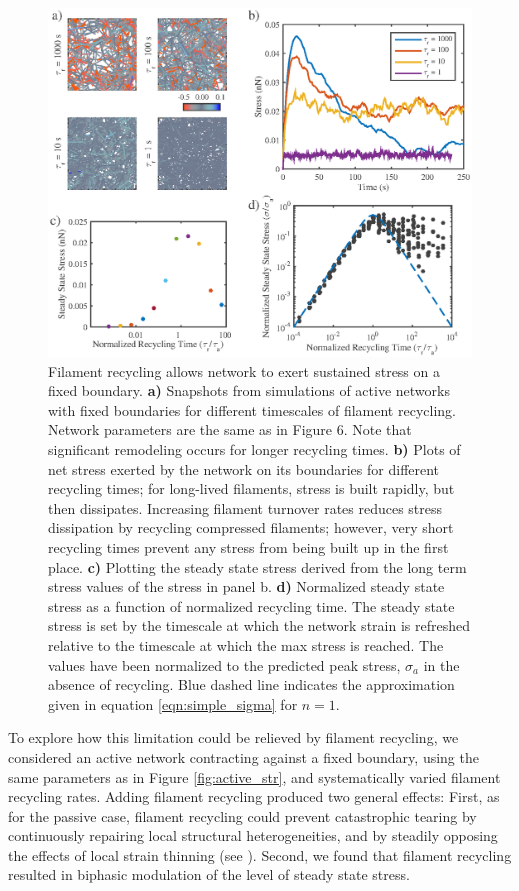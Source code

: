 \documentclass[10pt,letterpaper]{article}
\begin{document}
\begin{figure}[h!]
	\centering
	\includegraphics[width=\hsize]{figures/figure5b}
	\caption{\label{fig:active_rec} Filament recycling allows network to exert sustained stress on a fixed boundary. \textbf{a)} Snapshots from simulations of active networks with fixed boundaries for different timescales of filament recycling.  Network parameters are the same as in Figure 6. Note that significant remodeling occurs for longer recycling times. \textbf{b)} Plots of net stress exerted by the network on its boundaries for different recycling times; for long-lived filaments, stress is built rapidly, but then dissipates. Increasing filament turnover rates reduces stress dissipation by recycling compressed filaments; however, very short recycling times prevent any stress from being built up in the first place. \textbf{c)} Plotting the steady state stress derived from the long term stress values of the stress in panel b.  \textbf{d)} Normalized steady state stress as a function of normalized recycling time. The steady state stress is set by the timescale at which the network strain is refreshed relative to the timescale at which the max stress is reached. The values have been normalized to the predicted peak stress, $\sigma_a$ in the absence of recycling. Blue dashed line indicates the approximation given in equation \ref{eqn:simple_sigma} for $n=1$.}
\end{figure}

To explore how this limitation could be relieved by filament recycling, we considered an active network contracting against a fixed boundary, using the same parameters as in Figure \ref{fig:active_str}, and systematically varied filament recycling rates. Adding filament recycling produced two general effects: First, as for the passive case, filament recycling could prevent catastrophic tearing by continuously repairing local structural heterogeneities, and by steadily opposing the effects of local strain thinning (see ). Second, we found that filament recycling resulted in biphasic modulation of the level of steady state stress.
\end{document}
